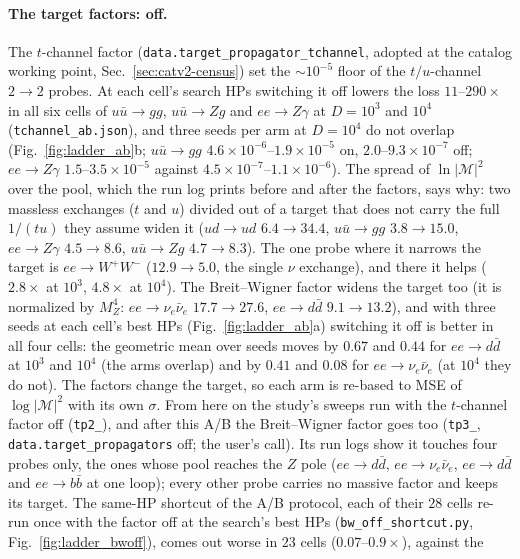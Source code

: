 \documentclass[11pt]{article}
\newcommand{\code}[1]{\texttt{#1}}
\begin{document}
\paragraph{The target factors: off.} The $t$-channel factor
(\code{data.target\_propagator\_tchannel}, adopted at the catalog working point,
Sec.~\ref{sec:catv2-census}) set the $\sim10^{-5}$ floor of the $t/u$-channel $2\to2$ probes. At
each cell's search HPs switching it off lowers the loss $11$--$290\times$ in all six cells of
$u\bar u\to gg$, $u\bar u\to Zg$ and $ee\to Z\gamma$ at $D=10^3$ and $10^4$
(\code{tchannel\_ab.json}), and three seeds per arm at $D=10^4$ do not overlap
(Fig.~\ref{fig:ladder_ab}b; $u\bar u\to gg$ $4.6\times10^{-6}$--$1.9\times10^{-5}$ on,
$2.0$--$9.3\times10^{-7}$ off; $ee\to Z\gamma$ $1.5$--$3.5\times10^{-5}$ against
$4.5\times10^{-7}$--$1.1\times10^{-6}$). The spread of $\ln|\mathcal M|^2$ over the pool, which
the run log prints before and after the factors, says why: two massless exchanges ($t$ and $u$)
divided out of a target that does not carry the full $1/(tu)$ they assume widen it ($ud\to ud$
$6.4\to34.4$, $u\bar u\to gg$ $3.8\to15.0$, $ee\to Z\gamma$ $4.5\to8.6$, $u\bar u\to Zg$
$4.7\to8.3$). The one probe where it narrows the target is $ee\to W^+W^-$ ($12.9\to5.0$, the
single $\nu$ exchange), and there it helps ($2.8\times$ at $10^3$, $4.8\times$ at $10^4$). The
Breit--Wigner factor widens the target too (it is normalized by $M_Z^4$: $ee\to\nu_e\bar\nu_e$
$17.7\to27.6$, $ee\to d\bar d$ $9.1\to13.2$), and with three seeds at each cell's best HPs
(Fig.~\ref{fig:ladder_ab}a) switching it off is better in all four cells: the geometric mean
over seeds moves by $0.67$ and $0.44$ for $ee\to d\bar d$ at $10^3$ and $10^4$ (the arms overlap)
and by $0.41$ and $0.08$ for $ee\to\nu_e\bar\nu_e$ (at $10^4$ they do not). The factors change the
target, so each arm is re-based to MSE of $\log|\mathcal M|^2$ with its own $\sigma$. From here on
the study's sweeps run with the $t$-channel factor off (\code{tp2\_}), and after this A/B the
Breit--Wigner factor goes too (\code{tp3\_}, \code{data.target\_propagators} off; the user's call). Its
run logs show it touches four probes only, the ones whose pool reaches the $Z$ pole ($ee\to d\bar d$,
$ee\to\nu_e\bar\nu_e$, $ee\to d\bar d$ and $ee\to b\bar b$ at one loop); every other probe carries no
massive factor and keeps its target. The same-HP shortcut of the A/B protocol, each of their $28$
cells re-run once with the factor off at the search's best HPs (\code{bw\_off\_shortcut.py},
Fig.~\ref{fig:ladder_bwoff}), comes out worse in $23$ cells ($0.07$--$0.9\times$), against the
\end{document}

